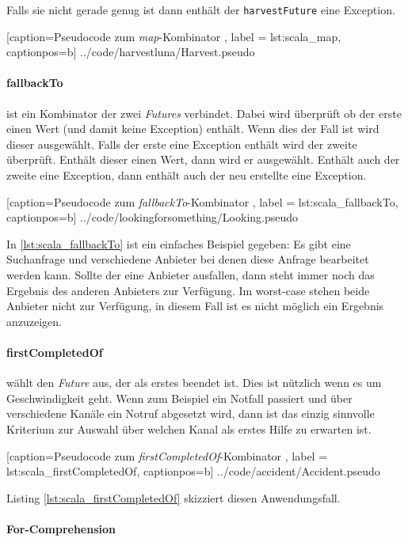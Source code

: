 Falls sie nicht gerade genug ist dann enthält der \texttt{harvestFuture}
eine Exception.


    [caption={Pseudocode zum \emph{map}-Kombinator },
       label = lst:scala_map,
       captionpos=b]
 {../code/harvestluna/Harvest.pseudo}
 
\paragraph{fallbackTo} ist ein Kombinator der zwei \emph{Futures}
verbindet. Dabei wird überprüft ob der erste einen Wert (und damit
keine Exception) enthält. Wenn dies der Fall ist wird dieser ausgewählt.
Falls der erste eine Exception enthält wird der zweite überprüft. Enthält
dieser einen Wert, dann wird er ausgewählt. Enthält auch der zweite
eine Exception, dann enthält auch der neu erstellte eine Exception.


    [caption={Pseudocode zum \emph{fallbackTo}-Kombinator },
       label = lst:scala_fallbackTo,
       captionpos=b]
 {../code/lookingforsomething/Looking.pseudo}
 
In \ref{lst:scala_fallbackTo} ist ein einfaches Beispiel gegeben:
Es gibt eine Suchanfrage und verschiedene Anbieter bei denen diese
Anfrage bearbeitet werden kann. Sollte der eine Anbieter ausfallen,
dann steht immer noch das Ergebnis des anderen Anbieters zur Verfügung.
Im worst-case stehen beide Anbieter nicht zur Verfügung, in diesem
Fall ist es nicht möglich ein Ergebnis anzuzeigen.

\paragraph{firstCompletedOf} wählt den \emph{Future} aus, der als
erstes beendet ist. Dies ist nützlich wenn es um Geschwindigkeit
geht. Wenn zum Beispiel ein Notfall passiert und über verschiedene
Kanäle ein Notruf abgesetzt wird, dann ist das einzig sinnvolle Kriterium
zur Auswahl über welchen Kanal als erstes Hilfe zu erwarten ist.


    [caption={Pseudocode zum \emph{firstCompletedOf}-Kombinator },
       label = lst:scala_firstCompletedOf,
       captionpos=b]
 {../code/accident/Accident.pseudo}
 
Listing \ref{lst:scala_firstCompletedOf} skizziert diesen
Anwendungsfall.

\paragraph{For-Comprehension}
